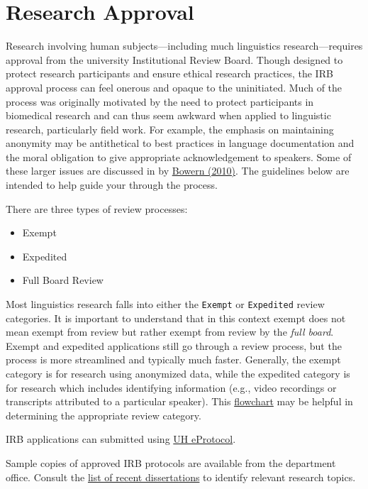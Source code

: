 \documentclass[
]{book}
\providecommand{\tightlist}{%
  \setlength{\itemsep}{0pt}\setlength{\parskip}{0pt}}
\begin{document}
\hypertarget{IRB}{%
\chapter{Research Approval}\label{IRB}}

Research involving human subjects---including much linguistics research---requires approval from the university Institutional Review Board. Though designed to protect research participants and ensure ethical research practices, the IRB approval process can feel onerous and opaque to the uninitiated. Much of the process was originally motivated by the need to protect participants in biomedical research and can thus seem awkward when applied to linguistic research, particularly field work. For example, the emphasis on maintaining anonymity may be antithetical to best practices in language documentation and the moral obligation to give appropriate acknowledgement to speakers. Some of these larger issues are discussed in by \href{https://www.jstor.org/stable/40961721}{Bowern (2010)}. The guidelines below are intended to help guide your through the process.

There are three types of review processes:

\begin{itemize}
\tightlist
\item
  Exempt
\item
  Expedited
\item
  Full Board Review
\end{itemize}

Most linguistics research falls into either the \texttt{Exempt} or \texttt{Expedited} review categories. It is important to understand that in this context exempt does not mean exempt from review but rather exempt from review by the \emph{full board}. Exempt and expedited applications still go through a review process, but the process is more streamlined and typically much faster. Generally, the exempt category is for research using anonymized data, while the expedited category is for research which includes identifying information (e.g., video recordings or transcripts attributed to a particular speaker). This \href{docs/irb_flowchart.pdf}{flowchart} may be helpful in determining the appropriate review category.

IRB applications can submitted using \href{https://uhmanoa.keyusa.net/}{UH eProtocol}.

Sample copies of approved IRB protocols are available from the department office. Consult the \href{http://ling.hawaii.edu/research-current/publications/dissertations/}{list of recent dissertations} to identify relevant research topics.
\end{document}
